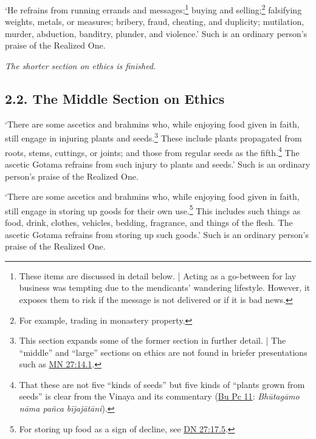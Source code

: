 \documentclass[12pt,openany]{book}%
\newcommand*{\scendsection}[1]{\begin{Center}\begin{small}\textit{#1}\end{small}\end{Center}\addvspace{1em}}
\begin{document}
‘He refrains from running errands and messages;\footnote{These items are discussed in detail below. | Acting as a go-between for lay business was tempting due to the mendicants’ wandering lifestyle. However, it exposes them to risk if the message is not delivered or if it is bad news. } buying and selling;\footnote{For example, trading in monastery property. } falsifying weights, metals, or measures; bribery, fraud, cheating, and duplicity; mutilation, murder, abduction, banditry, plunder, and violence.’ Such is an ordinary person’s praise of the Realized One. 

\scendsection{The shorter section on ethics is finished. }

\subsection*{2.2. The Middle Section on Ethics }

‘There are some ascetics and brahmins who, while enjoying food given in faith, still engage in injuring plants and seeds.\footnote{This section expands some of the former section in further detail. | The “middle” and “large” sections on ethics are not found in briefer presentations such as \href{https://suttacentral.net/mn27/en/sujato\#14.1}{MN 27:14.1}. } These include plants propagated from roots, stems, cuttings, or joints; and those from regular seeds as the fifth.\footnote{That these are not five “kinds of seeds” but five kinds of “plants grown from seeds” is clear from the Vinaya and its commentary (\href{https://suttacentral.net/pli-tv-bu-vb-pc11/en/sujato}{Bu Pc 11}:  \textit{\textsanskrit{Bhūtagāmo} \textsanskrit{nāma} \textsanskrit{pañca} \textsanskrit{bījajātāni}}). } The ascetic Gotama refrains from such injury to plants and seeds.’ Such is an ordinary person’s praise of the Realized One. 

‘There are some ascetics and brahmins who, while enjoying food given in faith, still engage in storing up goods for their own use.\footnote{For storing up food as a sign of decline, see \href{https://suttacentral.net/dn27/en/sujato\#17.5}{DN 27:17.5}. } This includes such things as food, drink, clothes, vehicles, bedding, fragrance, and things of the flesh. The ascetic Gotama refrains from storing up such goods.’ Such is an ordinary person’s praise of the Realized One. 
\end{document}
